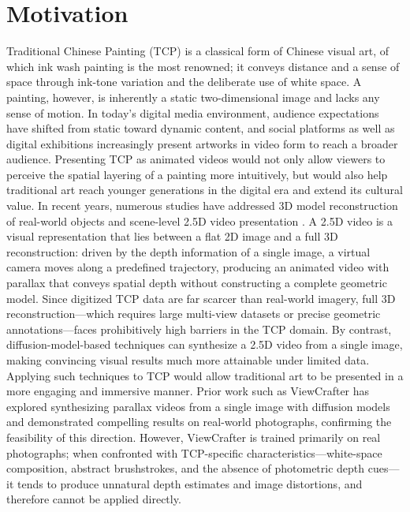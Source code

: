 \hspace{24pt}

\section{Motivation}

Traditional Chinese Painting (TCP) is a classical form of Chinese visual art,
of which ink wash painting is the most renowned;
it conveys distance and a sense of space through ink-tone variation and the deliberate use of white space.
A painting, however, is inherently a static two-dimensional image and lacks any sense of motion.
In today's digital media environment, audience expectations have shifted from static toward dynamic content,
and social platforms as well as digital exhibitions increasingly present artworks in video form to reach a broader audience.
Presenting TCP as animated videos would not only allow viewers to perceive the spatial layering of a painting more intuitively,
but would also help traditional art reach younger generations in the digital era and extend its cultural value.
In recent years, numerous studies have addressed 3D model reconstruction of real-world objects \cite{zero123}\cite{difix3d}
and scene-level 2.5D video presentation \cite{viewcrafter}\cite{wonderworld}\cite{trajectorycrafter}.
A 2.5D video is a visual representation that lies between a flat 2D image and a full 3D reconstruction:
driven by the depth information of a single image, a virtual camera moves along a predefined trajectory,
producing an animated video with parallax that conveys spatial depth without constructing a complete geometric model.
Since digitized TCP data are far scarcer than real-world imagery,
full 3D reconstruction---which requires large multi-view datasets or precise geometric annotations---faces
prohibitively high barriers in the TCP domain.
By contrast, diffusion-model-based techniques can synthesize a 2.5D video from a single image,
making convincing visual results much more attainable under limited data.
Applying such techniques to TCP would allow traditional art to be presented in a more engaging and immersive manner.
Prior work such as ViewCrafter \cite{viewcrafter} has explored synthesizing parallax videos from a single image with diffusion models
and demonstrated compelling results on real-world photographs, confirming the feasibility of this direction.
However, ViewCrafter is trained primarily on real photographs;
when confronted with TCP-specific characteristics---white-space composition, abstract brushstrokes,
and the absence of photometric depth cues---it tends to produce unnatural depth estimates and image distortions,
and therefore cannot be applied directly.

